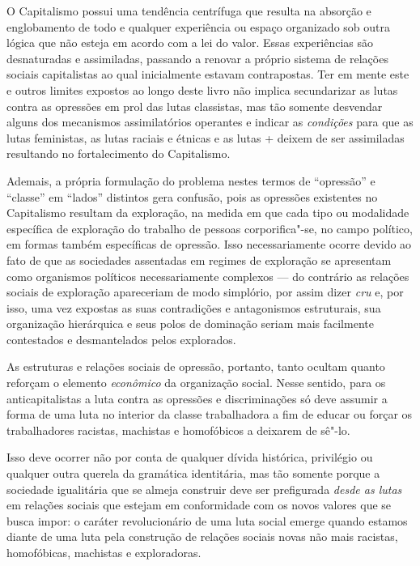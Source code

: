 O Capitalismo possui uma tendência centrífuga que resulta na absorção e
englobamento de todo e qualquer experiência ou espaço organizado sob
outra lógica que não esteja em acordo com a lei do valor. Essas
experiências são desnaturadas e assimiladas, passando a renovar a
próprio sistema de relações sociais capitalistas ao qual inicialmente
estavam contrapostas. Ter em mente este e outros limites expostos ao
longo deste livro não implica secundarizar as lutas contra as opressões
em prol das lutas classistas, mas tão somente desvendar alguns dos
mecanismos assimilatórios operantes e indicar as \emph{condições} para
que as lutas feministas, as lutas raciais e étnicas e as lutas +
deixem de ser assimiladas resultando no fortalecimento do Capitalismo.

Ademais, a própria formulação do problema nestes termos de ``opressão''
e ``classe'' em ``lados'' distintos gera confusão, pois as opressões
existentes no Capitalismo resultam da exploração, na medida em que cada
tipo ou modalidade específica de exploração do trabalho de pessoas
corporifica"-se, no campo político, em formas também específicas de
opressão. Isso necessariamente ocorre devido ao fato de que as
sociedades assentadas em regimes de exploração se apresentam como
organismos políticos necessariamente complexos --- do contrário as
relações sociais de exploração apareceriam de modo simplório, por assim
dizer \emph{cru} e, por isso, uma vez expostas as suas contradições e
antagonismos estruturais, sua organização hierárquica e seus polos de
dominação seriam mais facilmente contestados e desmantelados pelos
explorados.

As estruturas e relações sociais de opressão, portanto, tanto ocultam
quanto reforçam o elemento \emph{econômico} da organização social. Nesse
sentido, para os anticapitalistas a luta contra as opressões e
discriminações só deve assumir a forma de uma luta no interior da classe
trabalhadora a fim de educar ou forçar os trabalhadores racistas,
machistas e homofóbicos a deixarem de sê"-lo.

Isso deve ocorrer não por conta de qualquer dívida histórica, privilégio
ou qualquer outra querela da gramática identitária, mas tão somente
porque a sociedade igualitária que se almeja construir deve ser
prefigurada \emph{desde as lutas} em relações sociais que estejam em
conformidade com os novos valores que se busca impor: o caráter
revolucionário de uma luta social emerge quando estamos diante de uma
luta pela construção de relações sociais novas não mais racistas,
homofóbicas, machistas e exploradoras.

